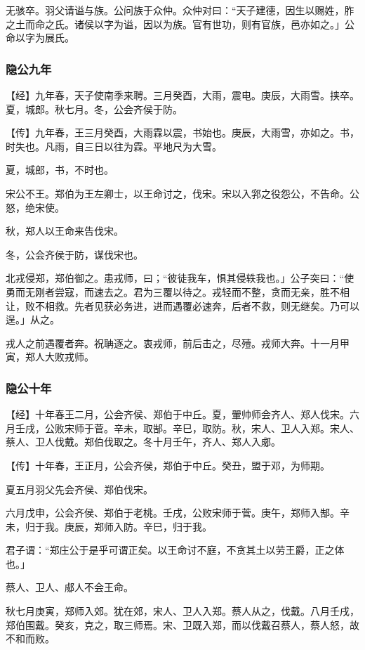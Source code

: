 \documentclass[]{article}
\begin{document}
无骇卒。羽父请谥与族。公问族于众仲。众仲对曰：``天子建德，因生以赐姓，胙之土而命之氏。诸侯以字为谥，因以为族。官有世功，则有官族，邑亦如之。」公命以字为展氏。

\hypertarget{header-n116}{%
\subsubsection{隐公九年}\label{header-n116}}

【经】九年春，天子使南季来聘。三月癸酉，大雨，震电。庚辰，大雨雪。挟卒。夏，城郎。秋七月。冬，公会齐侯于防。

【传】九年春，王三月癸酉，大雨霖以震，书始也。庚辰，大雨雪，亦如之。书，时失也。凡雨，自三日以往为霖。平地尺为大雪。

夏，城郎，书，不时也。

宋公不王。郑伯为王左卿士，以王命讨之，伐宋。宋以入郛之役怨公，不告命。公怒，绝宋使。

秋，郑人以王命来告伐宋。

冬，公会齐侯于防，谋伐宋也。

北戎侵郑，郑伯御之。患戎师，曰；``彼徒我车，惧其侵轶我也。」公子突曰：``使勇而无刚者尝寇，而速去之。君为三覆以待之。戎轻而不整，贪而无亲，胜不相让，败不相救。先者见获必务进，进而遇覆必速奔，后者不救，则无继矣。乃可以逞。」从之。

戎人之前遇覆者奔。祝聃逐之。衷戎师，前后击之，尽殪。戎师大奔。十一月甲寅，郑人大败戎师。

\hypertarget{header-n127}{%
\subsubsection{隐公十年}\label{header-n127}}

【经】十年春王二月，公会齐侯、郑伯于中丘。夏，翬帅师会齐人、郑人伐宋。六月壬戌，公败宋师于菅。辛未，取郜。辛巳，取防。秋，宋人、卫人入郑。宋人、蔡人、卫人伐戴。郑伯伐取之。冬十月壬午，齐人、郑人入郕。

【传】十年春，王正月，公会齐侯，郑伯于中丘。癸丑，盟于邓，为师期。

夏五月羽父先会齐侯、郑伯伐宋。

六月戊申，公会齐侯、郑伯于老桃。壬戌，公败宋师于菅。庚午，郑师入郜。辛未，归于我。庚辰，郑师入防。辛巳，归于我。

君子谓：``郑庄公于是乎可谓正矣。以王命讨不庭，不贪其土以劳王爵，正之体也。」

蔡人、卫人、郕人不会王命。

秋七月庚寅，郑师入郊。犹在郊，宋人、卫人入郑。蔡人从之，伐戴。八月壬戌，郑伯围戴。癸亥，克之，取三师焉。宋、卫既入郑，而以伐戴召蔡人，蔡人怒，故不和而败。
\end{document}
